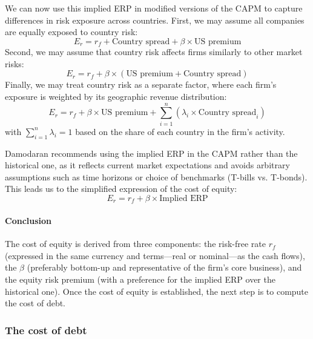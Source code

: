 We can now use this implied ERP in modified versions of the CAPM to capture differences in risk exposure across countries. First, we may assume all companies are equally exposed to country risk:
\begin{equation}
    E_r = r_f + \text{Country spread} + \beta \times \text{US premium}
\end{equation}
Second, we may assume that country risk affects firms similarly to other market risks:
\begin{equation}
    E_r = r_f + \beta \times (\text{US premium} + \text{Country spread})
\end{equation}
Finally, we may treat country risk as a separate factor, where each firm’s exposure is weighted by its geographic revenue distribution:
\begin{equation}
    E_r = r_f + \beta \times \text{US premium} + \sum_{i=1}^n(\lambda_i \times \text{Country spread}_i)
\end{equation}
with $\sum_{i=1}^n \lambda_i = 1$ based on the share of each country in the firm’s activity.

Damodaran recommends using the implied ERP in the CAPM rather than the historical one, as it reflects current market expectations and avoids arbitrary assumptions such as time horizons or choice of benchmarks (T-bills vs. T-bonds). This leads us to the simplified expression of the cost of equity:
\begin{equation}
    E_r = r_f + \beta \times \text{Implied ERP}
\end{equation}

\paragraph{Conclusion}

The cost of equity is derived from three components: the risk-free rate $r_f$ (expressed in the same currency and terms—real or nominal—as the cash flows), the $\beta$ (preferably bottom-up and representative of the firm’s core business), and the equity risk premium (with a preference for the implied ERP over the historical one). Once the cost of equity is established, the next step is to compute the cost of debt.

\subsubsection{The cost of debt}

